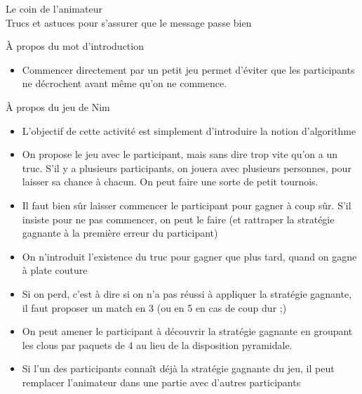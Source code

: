 \documentclass[final,hyperref={pdfpagelabels=false}]{beamer}
\renewcommand*{\large}{\fontsize{\resultlargeX}{\resultlargeY}\selectfont}
\begin{document}
\begin{frame}{Le coin de l'animateur\\[-5pt]
  {\large Trucs et astuces pour s'assurer que le message passe bien}}
\begin{block}{À propos du mot d'introduction}
\begin{itemize}
    \item Commencer directement par un petit jeu permet d'éviter que les
      participants ne décrochent avant même qu'on ne commence.
    \end{itemize}
  \end{block}
  \begin{block}{À propos du jeu de Nim}
    \begin{itemize}
    \item L'objectif de cette activité est simplement d'introduire la notion d'algorithme
    \item On propose le jeu avec le participant, mais sans dire trop vite qu'on
      a un truc. S'il y a plusieurs participants, on jouera avec plusieurs
      personnes, pour laisser sa chance à chacun. On peut faire une sorte de
      petit tournois.
    \item Il faut bien sûr laisser commencer le participant pour gagner à coup
      sûr. S'il insiste pour ne pas commencer, on peut le faire (et rattraper
      la stratégie gagnante à la première erreur du participant)
    \item On n'introduit l'existence du truc pour gagner que plus tard, quand
      on gagne à plate couture
    \item Si on perd, c'est à dire si on n'a pas réussi à appliquer la
      stratégie gagnante, il faut proposer un match en 3 (ou en 5 en cas de
      coup dur ;)
    \item On peut amener le participant à découvrir la stratégie gagnante en
      groupant les clous par paquets de 4 au lieu de la disposition pyramidale.
    \item Si l'un des participants connaît déjà la stratégie gagnante du jeu,
      il peut remplacer l'animateur dans une partie avec d'autres participants
    \end{itemize}
  \end{block}
\end{frame}
\end{document}
